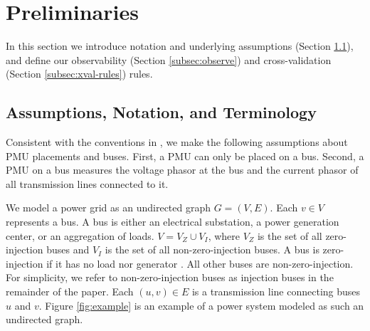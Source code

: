 \section{Preliminaries}
\label{sec:prelim}

In this section we introduce notation and underlying assumptions (Section \ref{subsec:notation-assume}), 
and define our observability (Section \ref{subsec:observe}) and cross-validation (Section \ref{subsec:xval-rules}) rules.


\subsection{Assumptions, Notation, and Terminology}
\label{subsec:notation-assume}


Consistent with the conventions in \cite{Baldwin93,Brueni05,Abur06,Mili90,Xu04,Xu05}, we make the following assumptions about PMU placements and buses. 
First, a PMU can only be placed on a bus.  Second, a PMU on a bus measures the voltage phasor at the bus and the current phasor of all transmission lines connected to it.


We model a power grid as an undirected graph $G=(V,E)$.  Each $v \in V$ represents a bus.  A bus is either an electrical substation, a power generation center, or an 
aggregation of loads. $V=V_Z \cup V_I$, where $V_Z$ is the set of all zero-injection buses and $V_I$ is the set of all non-zero-injection buses.  A bus is zero-injection if it has no load nor generator \cite{Zhang10}.
All other buses are non-zero-injection.  For simplicity, we refer to non-zero-injection buses as injection buses in the remainder of the paper. 
Each $(u,v) \in E$ is a transmission line connecting buses $u$ and $v$.  Figure \ref{fig:example} is an example of a power system modeled as such an undirected graph.

